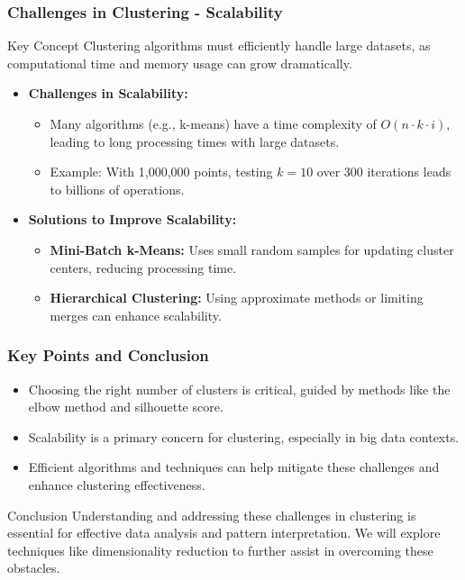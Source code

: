 \documentclass[aspectratio=169]{beamer}
\begin{document}
\begin{frame}[fragile]
  \frametitle{Challenges in Clustering - Scalability}
  \begin{block}{Key Concept}
    Clustering algorithms must efficiently handle large datasets, as computational time and memory usage can grow dramatically.
  \end{block}

  \begin{itemize}
    \item \textbf{Challenges in Scalability:}
      \begin{itemize}
        \item Many algorithms (e.g., k-means) have a time complexity of \(O(n \cdot k \cdot i)\), leading to long processing times with large datasets.
        \item Example: With 1,000,000 points, testing \(k = 10\) over 300 iterations leads to billions of operations.
      \end{itemize}
    
    \item \textbf{Solutions to Improve Scalability:}
      \begin{itemize}
        \item \textbf{Mini-Batch k-Means:} Uses small random samples for updating cluster centers, reducing processing time.
        \item \textbf{Hierarchical Clustering:} Using approximate methods or limiting merges can enhance scalability.
      \end{itemize}
  \end{itemize}
\end{frame}

\begin{frame}[fragile]
  \frametitle{Key Points and Conclusion}
  \begin{itemize}
    \item Choosing the right number of clusters is critical, guided by methods like the elbow method and silhouette score.
    \item Scalability is a primary concern for clustering, especially in big data contexts.
    \item Efficient algorithms and techniques can help mitigate these challenges and enhance clustering effectiveness.
  \end{itemize}

  \begin{block}{Conclusion}
    Understanding and addressing these challenges in clustering is essential for effective data analysis and pattern interpretation. 
    We will explore techniques like dimensionality reduction to further assist in overcoming these obstacles.
  \end{block}
\end{frame}
\end{document}
